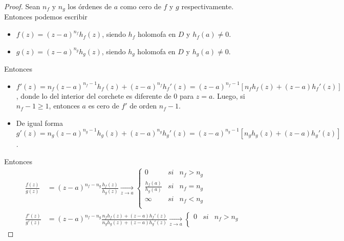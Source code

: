 \begin{proof}
    Sean $n_f$ y $n_g$ los órdenes de $a$ como cero de $f$ y $g$ respectivamente. Entonces podemos escribir
    \begin{itemize}
        \item $f(z) = (z-a)^{n_f}h_f(z)$, siendo $h_f$ holomofa en $D$ y $h_f(a) \not = 0$.
        \item $g(z) = (z-a)^{n_g}h_g(z)$, siendo $h_g$ holomofa en $D$ y $h_g(a) \not = 0$.
    \end{itemize}
    Entonces
    \begin{itemize}
        \item $f'(z) = n_f(z-a)^{n_f -1}h_f(z) + (z-a)^{n_f}h_f'(z) = (z-a)^{n_f -1}[n_fh_f(z) + (z-a)h_f'(z)]$, donde lo del interior del corchete es diferente de 0 para $z = a$. Luego, si $n_f -1 \ge 1$, entonces $a$ es cero de $f'$ de orden $n_f -1$.
        \item De igual forma $g'(z) = n_g(z-a)^{n_g -1}h_g(z) + (z-a)^{n_g}h_g'(z) = (z-a)^{n_g -1}[n_gh_g(z) + (z-a)h_g'(z)]$.
    \end{itemize}
    Entonces
    \begin{align*}
        \frac{f(z)}{g(z)}   & = (z-a)^{n_f - n_g} \frac{h_f(z)}{h_g(z)} \xrightarrow[z \to a]{} \left\{ \begin{array}{lcc}
                                                                                                            0                     & si & n_f > n_g \\
                                                                                                            \frac{h_f(a)}{h_g(a)} & si & n_f = n_g \\
                                                                                                            \infty                & si & n_f < n_g \\
                                                                                                        \end{array}
        \right.                                                                                                                                                                    \\
        \frac{f'(z)}{g'(z)} & = (z-a)^{n_f - n_g} \frac{n_fh_f(z) + (z-a)h_f'(z)}{n_gh_g(z) + (z-a)h_g'(z)} \xrightarrow[z \to a]{} \left\{ \begin{array}{lcc}
                                                                                                                                                0                     & si & n_f > n_g \\

\end{array}
\end{align*}
\end{proof}
